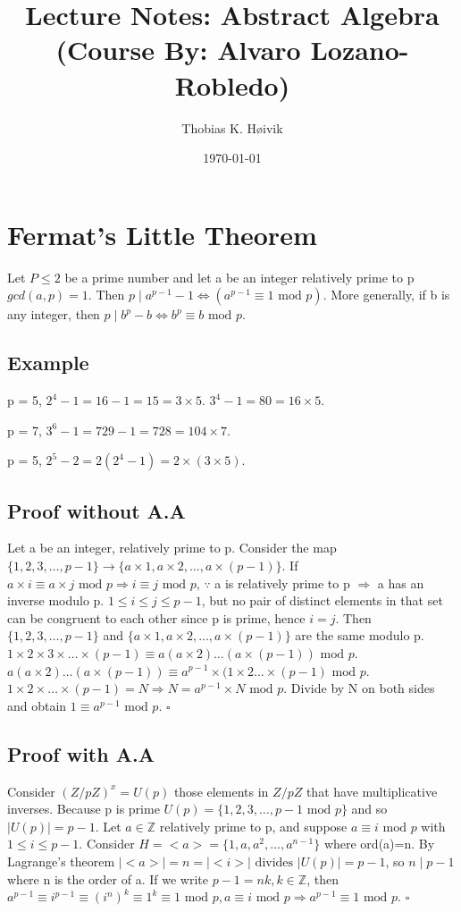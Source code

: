 \documentclass[12pt]{article}
\title{Lecture Notes: Abstract Algebra (Course By: Alvaro Lozano-Robledo)}
\author{Thobias K. Høivik}
\date{\today}
\begin{document}
\maketitle

\section{Fermat's Little Theorem}
Let \(P \leq 2\) be a prime number and let a be an integer relatively prime to p 
\(gcd(a, p) = 1\). Then \(p \mid a^{p-1}-1 
\Leftrightarrow (a^{p-1} \equiv 1 \text{ mod } p)\).
More generally, if b is any integer, then \(p \mid b^{p}-b 
\Leftrightarrow b^p \equiv b \text{ mod } p\).

\subsection*{Example}
p = 5, \(2^4-1 = 16-1 = 15 = 3 \times 5\). 
\(3^4 - 1 = 80 = 16 \times 5\).

\noindent 
p = 7, \(3^6 - 1 = 729 - 1 = 728 = 104 \times 7\).

\noindent 
p = 5, \(2^5-2 = 2(2^4 - 1) = 2 \times (3 \times 5)\).

\subsection*{Proof without A.A}
Let a be an integer, relatively prime to p. 
Consider the map
\(\{1,2,3,\dots, p-1\}\rightarrow \{a \times 1, a \times 2,\dots, a\times (p-1)\}\).
If \(a \times i \equiv a \times j \text{ mod } p 
\Rightarrow i \equiv j \text{ mod } p \text{, } \because \)  a is 
relatively prime to p \(\Rightarrow\) a has an inverse modulo p. 
\(1 \leq i \leq j \leq p-1\), but no pair of distinct elements 
in that set can be congruent to each other 
since p is prime, hence \(i = j\). Then \(\{1,2,3,\dots, p-1\}\) and 
\(\{a\times1,a\times2,\dots,a\times(p-1)\}\) are the same modulo p.
\(1\times2\times3\times\dots\times(p-1) \equiv 
a(a\times2)\dots(a\times(p-1)) \text{ mod } p\). 
\(a(a\times2)\dots(a\times(p-1)) \equiv a^{p-1} \times 
(1\times2\dots\times(p-1) \text{ mod } p\). 
\(1\times2\times\dots\times(p-1) = N \Rightarrow N = a^{p-1} \times N \text{ mod } p\). 
Divide by N on both sides and obtain \(1 \equiv a^{p-1} \text{ mod } p\). \(\square\)

\subsection*{Proof with A.A}
Consider \((Z/pZ)^x = U(p)\) those elements in \(Z/pZ\) that have multiplicative inverses. 
Because p is prime \(U(p) = \{1,2,3,\dots,p-1 \text{ mod } p\}\) and so 
\(|U(p)| = p-1\). Let \(a \in \mathbb Z\) relatively prime to p, and suppose 
\(a \equiv i \text{ mod } p\) with \(1 \leq i \leq p-1\). 
Consider \(H = <a> = \{1, a, a^2,\dots, a^{n-1}\}\) where ord(a)=n. 
By Lagrange's theorem \(|<a>| = n = |<i>| \text{ divides } |U(p)| = p-1\), so \(n \mid p-1\) where 
n is the order of a. If we write \(p-1 = nk, k \in \mathbb Z\), 
then \(a^{p-1} \equiv i^{p-1} \equiv (i^n)^k 
\equiv 1^k \equiv 1 \text{ mod } p, a \equiv 
i \text{ mod } p \Rightarrow a^{p-1} \equiv 1 \text{ mod } p\). \(\square\)
\end{document}

